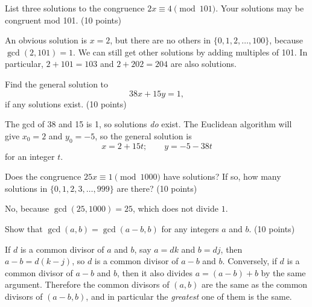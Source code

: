 \documentclass[12pt]{rudin}
\begin{document}
\begin{Exercise}
    List three solutions to the congruence $2x \equiv 4 \pmod{101}$. Your
    solutions may be congruent mod 101. (10 points)
\end{Exercise}

\begin{Answer}
    An obvious solution is $x = 2$, but there are no others in $\{0, 1, 2,
    \dots, 100\}$, because $\gcd(2, 101) = 1$. We can still get other solutions
    by adding multiples of 101. In particular, $2 + 101 = 103$ and $2 + 202 =
    204$ are also solutions.
\end{Answer}

\begin{Exercise}
    Find the general solution to
    \[
        38x + 15y = 1,
    \]
    if any solutions exist. (10 points)
\end{Exercise}

\begin{Answer}
    The gcd of 38 and 15 is 1, so solutions \emph{do} exist. The Euclidean
    algorithm will give $x_0 = 2$ and $y_0 = -5$, so the general solution is
    \[
        x = 2 + 15t; \qquad y = -5 - 38t
    \]
    for an integer $t$.
\end{Answer}

\begin{Exercise}
    Does the congruence $25 x \equiv 1 \pmod{1000}$ have solutions? If so, how
    many solutions in $\{0, 1, 2, 3, \dots, 999\}$ are there? (10 points)
\end{Exercise}

\begin{Answer}
    No, because $\gcd(25, 1000) = 25$, which does not divide $1$.
\end{Answer}

\begin{Exercise}
    Show that $\gcd(a, b) = \gcd(a - b, b)$ for any integers $a$ and $b$. (10 points)
\end{Exercise}

\begin{Answer}
    If $d$ is a common divisor of $a$ and $b$, say $a = dk$ and $b = dj$, then
    $a - b = d(k - j)$, so $d$ is a common divisor of $a - b$ and $b$.
    Conversely, if $d$ is a common divisor of $a - b$ and $b$, then it also
    divides $a = (a - b) + b$ by the same argument. Therefore the common
    divisors of $(a, b)$ are the same as the common divisors of $(a - b, b)$,
    and in particular the \emph{greatest} one of them is the same.
\end{Answer}
\end{document}
